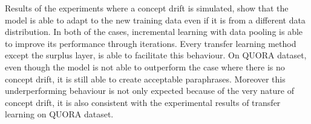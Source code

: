 Results of the experiments where a concept drift is simulated, show that the model is able to adapt to the new training data even if it is from a different data distribution. In both of the cases, incremental learning with data pooling is able to improve its performance through iterations. Every transfer learning method except the surplus layer, is able to facilitate this behaviour. On QUORA dataset, even though the model is not able to outperform the case where there is no concept drift, it is still able to create acceptable paraphrases. Moreover this underperforming behaviour is not only expected because of the very nature of concept drift, it is also consistent with the experimental results of transfer learning on QUORA dataset.



